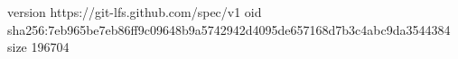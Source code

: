 version https://git-lfs.github.com/spec/v1
oid sha256:7eb965be7eb86ff9c09648b9a5742942d4095de657168d7b3c4abc9da3544384
size 196704
